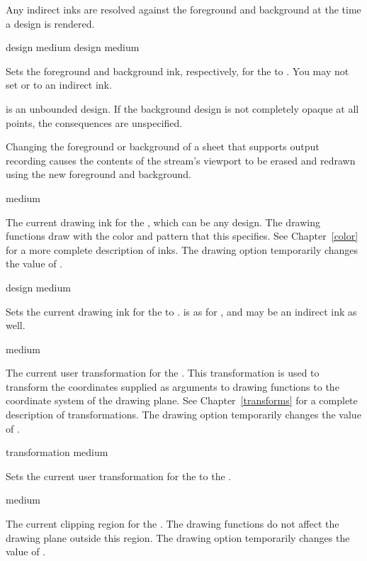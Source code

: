 Any indirect inks are resolved against the foreground and background at the time
a design is rendered.

 {design medium}
 {design medium}

Sets the foreground and background ink, respectively, for the 
 to .  You may not set  or
 to an indirect ink.  

 is an unbounded design.  If the background design is not completely
opaque at all points, the consequences are unspecified.

Changing the foreground or background of a sheet that supports output recording
causes the contents of the stream's viewport to be erased and redrawn using the
new foreground and background.


 {medium}

The current drawing ink for the  , which can be any
design.  The drawing functions draw with the color and pattern that this
specifies.  See Chapter~\ref{color} for a more complete description of inks.
The  drawing option temporarily changes the value of .

 {design medium}

Sets the current drawing ink for the   to .
 is as for , and may be an indirect ink as
well.


 {medium}

The current user transformation for the  .  This
transformation is used to transform the coordinates supplied as arguments to
drawing functions to the coordinate system of the drawing plane.  See
Chapter~\ref{transforms} for a complete description of transformations.  The
 drawing option temporarily changes the value of
.

 {transformation medium}

Sets the current user transformation for the   to the
 .


 {medium}

The current clipping region for the  .  The drawing
functions do not affect the drawing plane outside this region.  The
 drawing option temporarily changes the value of
.


